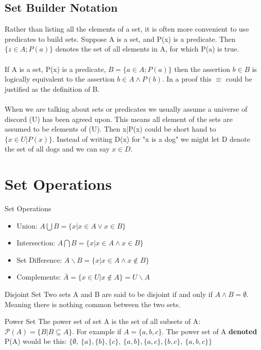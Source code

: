 \documentclass[../MATH-2000-Notes.tex]{subfiles}
\begin{document}
\subsection{Set Builder Notation}
Rather than listing all the elements of a set, it is often more convenient to use predicates to build sets. Suppose A is a set, and P(x) is a predicate. Then \(\{z\in A;P(a)\}\) denotes the set of all elements in A, for which P(a) is true.
\\~\\
If A is a set, P(x) is a predicate, \(B = \{a\in A; P(a)\}\) then the assertion \(b\in B\) is logically equivalent to the assertion \(b\in A \wedge P(b)\). In a proof this \(\equiv\) could be justified as the definition of B. 
\\~\\
When we are talking about sets or predicates we usually assume a universe of discord (U) has been agreed upon. This means all element of the sets are assumed to be elements of (U). Then {x|P(x)} could be short hand to \(\{x\in U|P(x)\}\). Instead of writing D(x) for "x is a dog" we might let D denote the set of all dogs and we can say \(x\in D\).

\section{Set Operations}
\begin{Theorem}
    {Set Operations}~\\
    \begin{itemize}
        \item Union: \(A\bigcup B =  \{x | x \in A \vee x\in B\}\)
        \item Intersection: \(A\bigcap B = \{x| x\in A \wedge x\in B\}\)
        \item Set Difference: \(A\backslash B = \{x | x\in A \wedge x\not\in B\}\)
        \item Complements: \(\bar{A} = \{x \in U | x\not\in A\} = U\backslash A\)
    \end{itemize}
\end{Theorem}
\begin{Definition}
    {Disjoint Set}
    Two sets A and B are said to be disjoint if and only if \(A \wedge B = \emptyset\). Meaning there is nothing common between the two sets.
\end{Definition}
\begin{Definition}
    {Power Set}
    The power set of set A is the set of all subsets of A: \(\mathcal{P}(A) = \{B|B\subseteq A\}\). For example if \(A = \{a,b,c\}\). The power set of A \textbf{denoted} P(A) would be this: \(\{\emptyset, \ \{a\}, \{b\}, \{c\}, \ \{a,b\}, \{a,c\}, \{b,c\}, \ \{a,b,c\} \}\)
\end{Definition}
\end{document}
